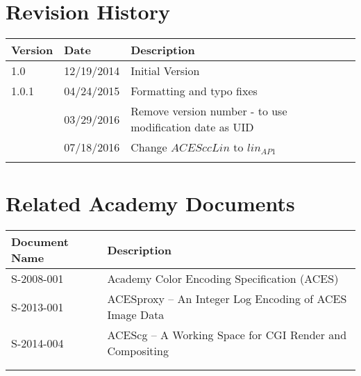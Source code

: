 \prelimsectionformat	%
\chapter{Revision History}

\begin{tabularx}{\linewidth}{|l|l|X|}
    \hline
    Version & Date & Description \\ \hline
    1.0     & 12/19/2014 & Initial Version      \\ \hline
    1.0.1   & 04/24/2015 & Formatting and typo fixes \\ \hline
            & 03/29/2016 & Remove version number - to use modification date as UID \\ \hline
            & 07/18/2016 & Change $ACESccLin$ to $lin_{AP1}$ \\ \hline
            &      &             \\ \hline
\end{tabularx}

\vspace{0.25in} %
\chapter{Related Academy Documents} %
\begin{tabularx}{\linewidth}{|l|X|}
    \hline
    Document Name & Description  \\ \hline
    S-2008-001 & Academy Color Encoding Specification (ACES) \\ \hline
    S-2013-001 & ACESproxy -- An Integer Log Encoding of ACES Image Data \\ \hline
    S-2014-004 & ACEScg -- A Working Space for CGI Render and Compositing             \\ \hline
    & \\ \hline
    & \\ \hline
\end{tabularx}